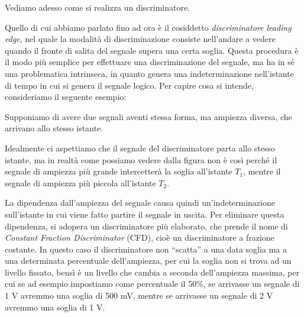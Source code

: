 Vediamo adesso come si realizza un discriminatore.

Quello di cui abbiamo parlato fino ad ora è il cosiddetto \textit{discriminatore leading edge}, nel quale la modalità di discriminazione consiste nell'andare a vedere quando il fronte di salita del segnale supera una certa soglia. Questa procedura è il modo più semplice per effettuare una discriminazione del segnale, ma ha in sé una problematica intrinseca, in quanto genera una indeterminazione nell'istante di tempo in cui si genera il segnale logico. Per capire cosa si intende, consideriamo il seguente esempio:
\begin{esempio}
   Supponiamo di avere due segnali aventi stessa forma, ma ampiezza diversa, che arrivano allo stesso istante.

   \vspace{-0.15cm}

   \begin{figure}[H]
      \centering
   \end{figure}

   \vspace{-0.4cm}Idealmente ci aspettiamo che il segnale del discriminatore parta allo stesso istante, ma in realtà come possiamo vedere dalla figura non è così perché il segnale di ampiezza più grande intercetterà la soglia all'istante $T_1$, mentre il segnale di ampiezza più piccola all'istante $T_2$.
\end{esempio}

\vspace{-0.1cm}La dipendenza dall'ampiezza del segnale causa quindi un'indeterminazione sull'istante in cui viene fatto partire il segnale in uscita. Per eliminare questa dipendenza, si adopera un discriminatore più elaborato, che prende il nome di \textit{Constant Fraction Discriminator} (CFD), cioè un discriminatore a frazione costante. In questo caso il discriminatore non ``scatta'' a una data soglia ma a una determinata percentuale dell'ampiezza, per cui la soglia non si trova ad un livello fissato, bensì è un livello che cambia a seconda dell'ampiezza massima, per cui se ad esempio impostiamo come percentuale il 50\%, se arrivasse un segnale di 1 V avremmo una soglia di 500 mV, mentre se arrivasse un segnale di 2 V avremmo una soglia di 1 V.

